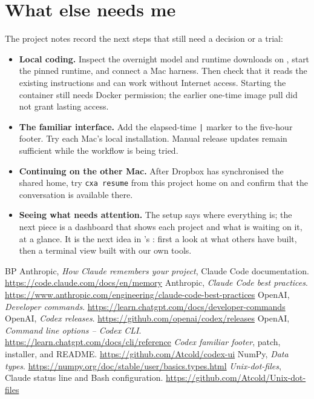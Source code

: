 \documentclass[11pt,a4paper]{article}
\begin{document}
\section{What else needs me}

The project notes record the next steps that still need a decision or a trial:

\begin{itemize}[leftmargin=1.2em]
  \item \textbf{Local coding.} Inspect the overnight model and runtime downloads on , start the pinned runtime, and connect a Mac harness. Then check that it reads the existing instructions and can work without Internet access. Starting the container still needs Docker permission; the earlier one-time image pull did not grant lasting access.
  \item \textbf{The familiar interface.} Add the elapsed-time \texttt{|} marker to the five-hour footer. Try each Mac’s local installation. Manual release updates remain sufficient while the workflow is being tried.
  \item \textbf{Continuing on the other Mac.} After Dropbox has synchronised the shared home, try \texttt{cxa resume} from this project home on  and confirm that the conversation is available there.
  \item \textbf{Seeing what needs attention.} The setup says where everything is; the next piece is a dashboard that shows each project and what is waiting on it, at a glance. It is the next idea in 's : first a look at what others have built, then a terminal view built with our own tools.
\end{itemize}

\begin{thebibliography}{BP}
   Anthropic, \textit{How Claude remembers your project}, Claude Code documentation. \url{https://code.claude.com/docs/en/memory}
   Anthropic, \textit{Claude Code best practices}. \url{https://www.anthropic.com/engineering/claude-code-best-practices}
   OpenAI, \textit{Developer commands}. \url{https://learn.chatgpt.com/docs/developer-commands}
   OpenAI, \textit{Codex releases}. \url{https://github.com/openai/codex/releases}
   OpenAI, \textit{Command line options -- Codex CLI}. \url{https://learn.chatgpt.com/docs/cli/reference}
   \textit{Codex familiar footer}, patch, installer, and README. \url{https://github.com/Atcold/codex-ui}
   NumPy, \textit{Data types}. \url{https://numpy.org/doc/stable/user/basics.types.html}
   \textit{Unix-dot-files}, Claude status line and Bash configuration. \url{https://github.com/Atcold/Unix-dot-files}
\end{thebibliography}

\revisiontable
\end{document}
